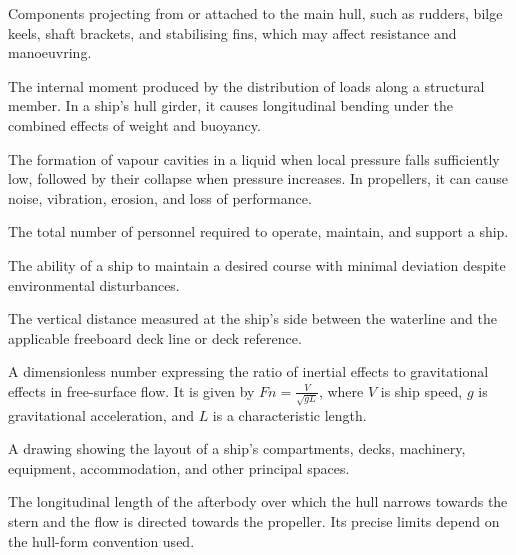 \begin{appendices}
\begin{description}[
    leftmargin=4.3cm,
    labelwidth=3.8cm,
    labelsep=0.25cm,
    align=left,
    style=multiline,
    itemsep=0.65em,
    parsep=0pt,
    font=\normalfont\bfseries
]

\item[Appendages]
Components projecting from or attached to the main hull, such as rudders, bilge keels, shaft brackets, and stabilising fins, which may affect resistance and manoeuvring.

\item[Bending Moment]
The internal moment produced by the distribution of loads along a structural member. In a ship's hull girder, it causes longitudinal bending under the combined effects of weight and buoyancy.

\item[Cavitation]
The formation of vapour cavities in a liquid when local pressure falls sufficiently low, followed by their collapse when pressure increases. In propellers, it can cause noise, vibration, erosion, and loss of performance.

\item[Complement]
The total number of personnel required to operate, maintain, and support a ship.

\item[Course-Keeping]
The ability of a ship to maintain a desired course with minimal deviation despite environmental disturbances.

\item[Freeboard]
The vertical distance measured at the ship's side between the waterline and the applicable freeboard deck line or deck reference.

\item[Froude Number ($Fn$)]
A dimensionless number expressing the ratio of inertial effects to gravitational effects in free-surface flow. It is given by
$Fn = \frac{V}{\sqrt{gL}}$, where $V$ is ship speed, $g$ is gravitational acceleration, and $L$ is a characteristic length.

\item[General Arrangement (GA)]
A drawing showing the layout of a ship's compartments, decks, machinery, equipment, accommodation, and other principal spaces.

\item[Length of Run ($L_R$)]
The longitudinal length of the afterbody over which the hull narrows towards the stern and the flow is directed towards the propeller. Its precise limits depend on the hull-form convention used.


\end{description}
\end{appendices}
